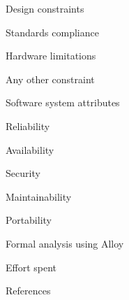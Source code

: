 \documentclass{article}
\begin{document}
\begin{legal}
\begin{legal}
		\item Design constraints
			\begin{legal}
			\item Standards compliance
			\item Hardware limitations
			\item Any other constraint
  			\end{legal}
		\item Software system attributes
			\begin{legal}
			\item Reliability
			\item Availability
			\item Security
			\item Maintainability
			\item Portability
  			\end{legal}
  		\end{legal}
	\item Formal analysis using Alloy
  	\item Effort spent
	\item References
	\end{legal}
\end{document}
